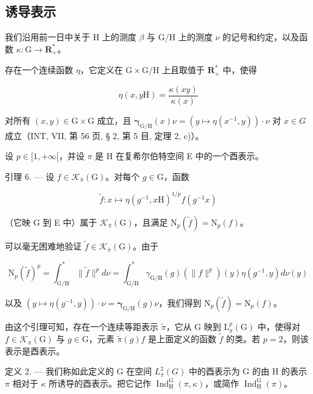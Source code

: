 \subsection{诱导表示}

我们沿用前一日中关于 H 上的测度 \(\beta\) 与 G/H 上的测度 \(\nu\) 的记号和约定，以及函数 \(\kappa\colon\mathrm{G}\to\mathbf{R}_{+}^{*}\)。

存在一个连续函数 \(\eta\)，它定义在 \(\mathrm{G} \times \mathrm{G} / \mathrm{H}\) 上且取值于 \(\mathbf{R}_{+}^{*}\) 中，使得

\[
\eta (x, y \mathrm{H}) = \frac {\kappa (x y)}{\kappa (x)}
\]

对所有 \((x,y)\in\mathrm{G}\times\mathrm{G}\) 成立，且 \(\boldsymbol{\gamma}_{\mathrm{G}/\mathrm{H}}(x)\nu=(y\mapsto\eta(x^{-1},y))\cdot\nu\) 对 \(x\in G\) 成立（INT, VII, 第 56 页, § 2, 第 5 目, 定理 2, c)）。

设 \(p \in [1, +\infty[\)，并设 \(\pi\) 是 H 在复希尔伯特空间 E 中的一个酉表示。

引理 6. --- 设 \(f \in \mathcal{K}_{\overline{\pi}}(\mathrm{G})\)。对每个 \(g \in \mathrm{G}\)，函数

\[
\widetilde {f} \colon x \mapsto \eta (g ^ {- 1}, x \mathrm{H}) ^ {1 / p} f (g ^ {- 1} x)
\]

（它映 G 到 E 中）属于 \(\mathcal{K}_{\overline{\pi}}(\mathrm{G})\)，且满足 \(\mathrm{N}_p(\widetilde{f}) = \mathrm{N}_p(f)\)。

可以毫无困难地验证 \(\tilde{f} \in \mathcal{K}_{\overline{\pi}}(\mathrm{G})\)。由于

\[
\mathrm{N} _ {p} (\widetilde {f}) ^ {p} = \int_ {\mathrm{G/H}} ^ {*} \| \widetilde {f} \| ^ {p} d \nu = \int_ {\mathrm{G/H}} ^ {*} \gamma_ {\mathrm{G/H}} (g) (\| f \| ^ {p}) (y) \eta (g ^ {- 1}, y) d \nu (y)
\]

 以及 \((y\mapsto \eta (g^{-1},y))\cdot \nu = \pmb{\gamma}_{\mathrm{G / H}}(g)\nu\)，我们得到 \(\mathrm{N}_p(\widetilde{f}) = \mathrm{N}_p(f)\)。

 由这个引理可知，存在一个连续等距表示 \(\widetilde{\pi}\)，它从 G 映到 \(\mathrm{L}_{\overline{\pi}}^{p}(\mathrm{G})\) 中，使得对 \(f\in \mathcal{K}_{\pi}(\mathrm{G})\) 与 \(g\in \mathrm{G}\)，元素 \(\widetilde{\pi}(g)f\) 是上面定义的函数 \(\widetilde{f}\) 的类。若 \(p=2\)，则该表示是酉表示。

定义 2. --- 我们称如此定义的 G 在空间 \(L_{\overline{\pi}}^{2}(G)\) 中的酉表示为 G 的由 H 的表示 \(\pi\) 相对于 \(\kappa\) 所诱导的酉表示。把它记作 \(\operatorname{Ind}_{\mathrm{H}}^{\mathrm{G}}(\pi, \kappa)\)，或简作 \(\operatorname{Ind}_{\mathrm{H}}^{\mathrm{G}}(\pi)\)。

